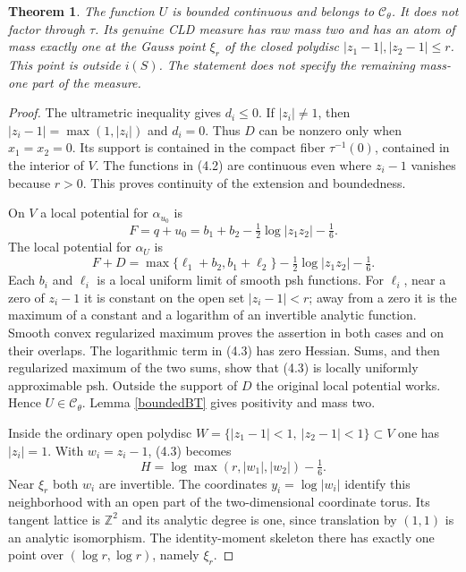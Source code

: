 \documentclass[11pt]{article}
\newtheorem{theorem}{Theorem}
\theoremstyle{definition}\newtheorem{definition}[theorem]{Definition}
\newcommand{\Z}{\mathbb Z}
\begin{document}
\begin{theorem}\label{branch}
The function $U$ is bounded continuous and belongs to $\mathcal C_\theta$.
It does not factor through $\tau$. Its genuine CLD measure has raw mass two
and has an atom of mass exactly one at the Gauss point $\xi_r$ of the closed
polydisc $|z_1-1|,|z_2-1|\le r$. This point is outside $i(S)$.
The statement does not specify the remaining mass-one part of the measure.
\end{theorem}
\begin{proof}
The ultrametric inequality gives $d_i\le0$. If $|z_i|\ne1$, then
$|z_i-1|=\max(1,|z_i|)$ and $d_i=0$. Thus $D$ can be nonzero only
when $x_1=x_2=0$. Its support is contained in the compact fiber
$\tau^{-1}(0)$, contained in the interior of $V$. The functions in (4.2)
are continuous even where $z_i-1$ vanishes because $r>0$. This proves
continuity of the extension and boundedness.

On $V$ a local potential for $\alpha_{u_0}$ is
\[
 F=q+u_0=b_1+b_2-\tfrac12\log|z_1z_2|-\tfrac16.
\]
The local potential for $\alpha_U$ is
\[
 F+D=\max\{\ell_1+b_2,b_1+\ell_2\}
           -\tfrac12\log|z_1z_2|-\tfrac16.              \tag{4.3}
\]
Each $b_i$ and $\ell_i$ is a local uniform limit of smooth psh functions.
For $\ell_i$, near a zero of $z_i-1$ it is constant on the open set
$|z_i-1|<r$; away from a zero it is the maximum of a constant and a
logarithm of an invertible analytic function. Smooth convex regularized
maximum proves the assertion in both cases and on their overlaps. The
logarithmic term in (4.3) has zero Hessian. Sums, and then regularized
maximum of the two sums, show that (4.3) is locally uniformly approximable
psh. Outside the support of $D$ the original local potential works. Hence
$U\in\mathcal C_\theta$. Lemma \ref{boundedBT} gives positivity and mass two.

Inside the ordinary open polydisc
$W=\{|z_1-1|<1,\ |z_2-1|<1\}\subset V$ one has $|z_i|=1$.
With $w_i=z_i-1$, (4.3) becomes
\[
 H=\log\max(r,|w_1|,|w_2|)-\tfrac16.                   \tag{4.4}
\]
Near $\xi_r$ both $w_i$ are invertible. The coordinates
$y_i=\log|w_i|$ identify this neighborhood with an open part of the
two-dimensional coordinate torus. Its tangent lattice is $\Z^2$ and its
analytic degree is one, since translation by $(1,1)$ is an analytic
isomorphism. The identity-moment skeleton there has exactly one point
over $(\log r,\log r)$, namely $\xi_r$.


\end{proof}
\end{document}
